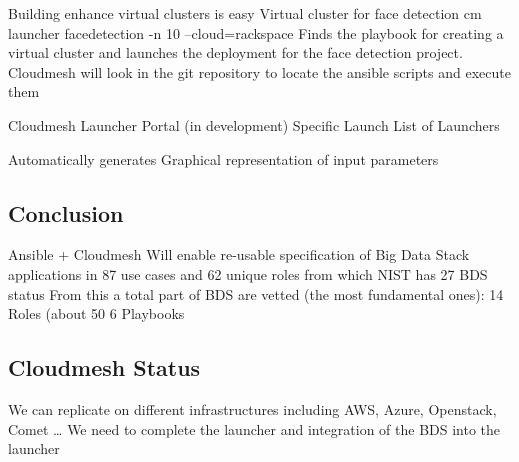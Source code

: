 Building enhance virtual clusters is easy
Virtual cluster for face detection
cm launcher facedetection -n 10 --cloud=rackspace
Finds the playbook for creating a virtual cluster and launches the deployment for the face detection project.
Cloudmesh will look in the git repository to locate the ansible scripts and execute them


Cloudmesh Launcher Portal (in development)
       Specific Launch                                    List of Launchers





Automatically generates Graphical representation of input parameters                                  
\subsection{Conclusion}
Ansible + Cloudmesh
Will enable re-usable specification of Big Data Stack applications in 87 use cases and 62 unique roles from which NIST has 27
BDS status
From this a total part of BDS are vetted (the most fundamental ones): 
14 Roles  (about 50%
6   Playbooks

\subsection{Cloudmesh Status}
We can replicate on different infrastructures including AWS, Azure, Openstack, Comet …
We need to complete the launcher and integration of the BDS into the launcher



